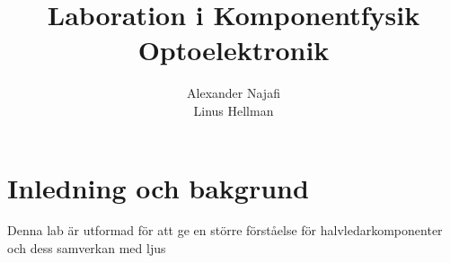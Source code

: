 \documentclass[a4paper]{article}
\title{Laboration i Komponentfysik\\ Optoelektronik}
\author{Alexander Najafi \\ Linus Hellman}
\begin{document}
\maketitle
\thispagestyle{empty}
\newpage

\tableofcontents
\newpage

\section{Inledning och bakgrund}

Denna lab är utformad för att ge en större förståelse för halvledarkomponenter och dess samverkan med ljus
\end{document}
